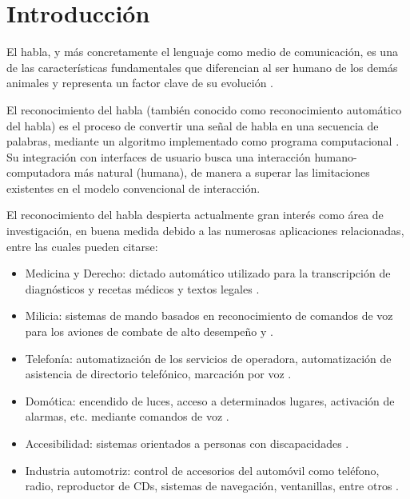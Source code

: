 \section{Introducci\'{o}n}
\label{sec:intro}

El habla, y m\'{a}s concretamente el lenguaje como medio de comunicaci\'{o}n, es una de las 
caracter\'{i}sticas fundamentales 
que diferencian al ser humano de los dem\'{a}s animales y representa un factor clave de su evoluci\'{o}n \cite{SchepartzLanguage1993}. 

El reconocimiento del habla (tambi\'{e}n conocido como reconocimiento autom\'{a}tico del habla) 
es el proceso de convertir
una se\~{n}al de habla en una secuencia de palabras, mediante un algoritmo implementado como 
programa computacional \cite{JaisalAReview2012}. Su integraci\'{o}n con interfaces de usuario busca una interacci\'{o}n 
humano-computadora m\'{a}s natural (humana), de manera a superar las limitaciones existentes 
en el modelo convencional de interacci\'{o}n.

El reconocimiento del habla despierta actualmente gran inter\'{e}s como \'{a}rea de investigaci\'{o}n, 
en buena medida debido a las numerosas aplicaciones relacionadas, entre las cuales pueden citarse:

\begin{itemize}
    \item Medicina y Derecho: dictado autom\'{a}tico utilizado para la transcripci\'{o}n de 
     diagn\'{o}sticos y recetas m\'{e}dicos y textos legales \cite{GrassoTheLong2003}.

    \item Milicia: sistemas de mando basados en reconocimiento de comandos de voz para los aviones 
     de combate de alto desempe\~{n}o \cite{Eurofighter} y \cite{WeinsteinOpportunities1991}.

    \item Telefon\'{i}a: automatizaci\'{o}n de los servicios de operadora, automatizaci\'{o}n de 
     asistencia de directorio telef\'{o}nico, marcaci\'{o}n por voz \cite{RabinerAutomatic1997}.

    \item Dom\'{o}tica: encendido de luces, acceso a determinados lugares, activaci\'{o}n de alarmas, etc. 
     mediante comandos de voz \cite{BellesiReconocimiento2008}.

    \item Accesibilidad: sistemas orientados a personas con discapacidades \cite{MirandaUnJuego2007}.

    \item Industria automotriz: control de accesorios del autom\'{o}vil como tel\'{e}fono, radio, 
     reproductor de CDs, sistemas de navegaci\'{o}n, ventanillas, entre otros \cite{SalaSpeech1999}.
\end{itemize}


